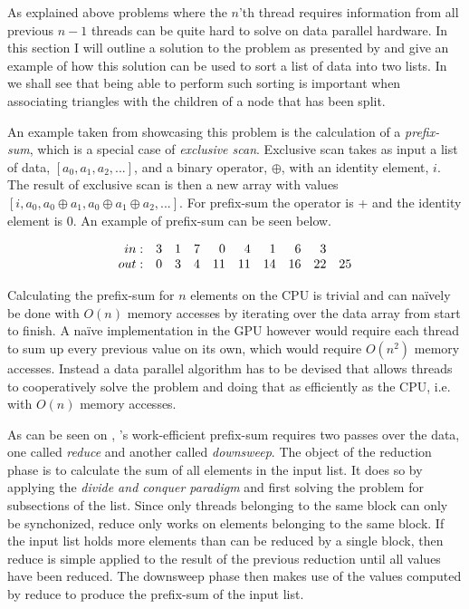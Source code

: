 
As explained above problems where the $n$’th thread requires information from
all previous $n-1$ threads can be quite hard to solve on data parallel
hardware. In this section I will outline a solution to the problem as presented
by \sengupta{} and give an example of how this solution can be used to sort a
list of data into two lists. In  we shall see that
being able to perform such sorting is important when associating triangles with
the children of a node that has been split.


An example taken from \sengupta{} showcasing this problem is the calculation of
a \textit{prefix-sum}, which is a special case of \textit{exclusive
  scan}. Exclusive scan takes as input a list of data, $[a_0, a_1, a_2, ...]$,
and a binary operator, $\oplus$, with an identity element, $i$. The result of
exclusive scan is then a new array with values $[i, a_0, a_0 \oplus a_1, a_0
  \oplus a_1 \oplus a_2, ...]$. For prefix-sum the operator is + and the
identity element is 0. An example of prefix-sum can be seen below.

\begin{displaymath}
  \begin{array}{r r r r r r r r r r}
    in: & 3 & 1 & 7 & 0 & 4 & 1 & 6 & 3 \\
    out: & 0 & 3 & 4 & 11 & 11 & 14 & 16 & 22 & 25 \\
  \end{array}
\end{displaymath}

Calculating the prefix-sum for $n$ elements on the CPU is trivial and can
naïvely be done with $O(n)$ memory accesses by iterating over the data array
from start to finish. A naïve implementation in the GPU however would require
each thread to sum up every previous value on its own, which would require
$O(n^2)$ memory accesses. Instead a data parallel algorithm has to be devised
that allows threads to cooperatively solve the problem and doing that as
efficiently as the CPU, i.e. with $O(n)$ memory accesses.



As can be seen on , \sengupta{}'s work-efficient prefix-sum
requires two passes over the data, one called \textit{reduce} and another called
\textit{downsweep}. The object of the reduction phase is to calculate the sum of
all elements in the input list. It does so by applying the \textit{divide and
  conquer paradigm} and first solving the problem for subsections of the
list. Since only threads belonging to the same block can only be synchonized,
reduce only works on elements belonging to the same block. If the input list
holds more elements than can be reduced by a single block, then reduce is simple
applied to the result of the previous reduction until all values have been
reduced. The downsweep phase then makes use of the values computed by reduce to
produce the prefix-sum of the input list.

